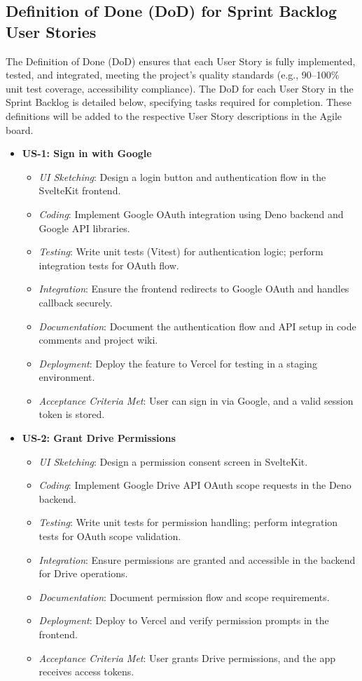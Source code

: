 \documentclass[12pt]{article}
\begin{document}
\subsection{Definition of Done (DoD) for Sprint Backlog User Stories}
The Definition of Done (DoD) ensures that each User Story is fully implemented, tested, and integrated, meeting the project's quality standards (e.g., 90–100\% unit test coverage, accessibility compliance). The DoD for each User Story in the Sprint Backlog is detailed below, specifying tasks required for completion. These definitions will be added to the respective User Story descriptions in the Agile board.

\begin{itemize}
  \item \textbf{US-1: Sign in with Google}
    \begin{itemize}
      \item \textit{UI Sketching}: Design a login button and authentication flow in the SvelteKit frontend.
      \item \textit{Coding}: Implement Google OAuth integration using Deno backend and Google API libraries.
      \item \textit{Testing}: Write unit tests (Vitest) for authentication logic; perform integration tests for OAuth flow.
      \item \textit{Integration}: Ensure the frontend redirects to Google OAuth and handles callback securely.
      \item \textit{Documentation}: Document the authentication flow and API setup in code comments and project wiki.
      \item \textit{Deployment}: Deploy the feature to Vercel for testing in a staging environment.
      \item \textit{Acceptance Criteria Met}: User can sign in via Google, and a valid session token is stored.
    \end{itemize}

  \item \textbf{US-2: Grant Drive Permissions}
    \begin{itemize}
      \item \textit{UI Sketching}: Design a permission consent screen in SvelteKit.
      \item \textit{Coding}: Implement Google Drive API OAuth scope requests in the Deno backend.
      \item \textit{Testing}: Write unit tests for permission handling; perform integration tests for OAuth scope validation.
      \item \textit{Integration}: Ensure permissions are granted and accessible in the backend for Drive operations.
      \item \textit{Documentation}: Document permission flow and scope requirements.
      \item \textit{Deployment}: Deploy to Vercel and verify permission prompts in the frontend.
      \item \textit{Acceptance Criteria Met}: User grants Drive permissions, and the app receives access tokens.
    \end{itemize}


\end{itemize}
\end{document}
